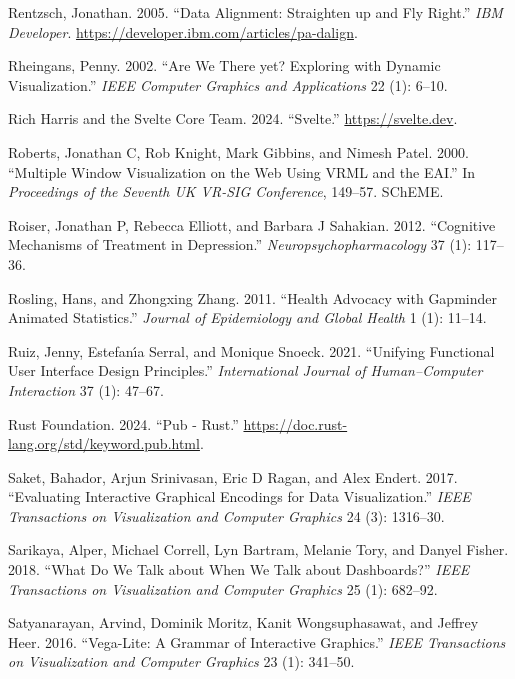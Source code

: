 \documentclass[
]{book}
\newlength{\cslhangindent}
\newenvironment{CSLReferences}[2] %
 {\begin{list}{}{%
  \setlength{\itemindent}{0pt}
  \setlength{\leftmargin}{0pt}
  \setlength{\parsep}{0pt}
  \ifodd #1
   \setlength{\leftmargin}{\cslhangindent}
   \setlength{\itemindent}{-1\cslhangindent}
  \fi
  \setlength{\itemsep}{#2\baselineskip}}}
 {\end{list}}
\theoremstyle{definition}
\theoremstyle{definition}
\theoremstyle{definition}
\theoremstyle{definition}
\theoremstyle{remark}
\begin{document}
\begin{CSLReferences}{1}{0}
Rentzsch, Jonathan. 2005. {``Data Alignment: Straighten up and Fly Right.''} \emph{IBM Developer}. \url{https://developer.ibm.com/articles/pa-dalign}.

Rheingans, Penny. 2002. {``Are We There yet? Exploring with Dynamic Visualization.''} \emph{IEEE Computer Graphics and Applications} 22 (1): 6--10.

Rich Harris and the Svelte Core Team. 2024. {``Svelte.''} \url{https://svelte.dev}.

Roberts, Jonathan C, Rob Knight, Mark Gibbins, and Nimesh Patel. 2000. {``Multiple Window Visualization on the Web Using VRML and the EAI.''} In \emph{Proceedings of the Seventh UK VR-SIG Conference}, 149--57. SChEME.

Roiser, Jonathan P, Rebecca Elliott, and Barbara J Sahakian. 2012. {``Cognitive Mechanisms of Treatment in Depression.''} \emph{Neuropsychopharmacology} 37 (1): 117--36.

Rosling, Hans, and Zhongxing Zhang. 2011. {``Health Advocacy with Gapminder Animated Statistics.''} \emph{Journal of Epidemiology and Global Health} 1 (1): 11--14.

Ruiz, Jenny, Estefanı́a Serral, and Monique Snoeck. 2021. {``Unifying Functional User Interface Design Principles.''} \emph{International Journal of Human--Computer Interaction} 37 (1): 47--67.

Rust Foundation. 2024. {``Pub - Rust.''} \url{https://doc.rust-lang.org/std/keyword.pub.html}.

Saket, Bahador, Arjun Srinivasan, Eric D Ragan, and Alex Endert. 2017. {``Evaluating Interactive Graphical Encodings for Data Visualization.''} \emph{IEEE Transactions on Visualization and Computer Graphics} 24 (3): 1316--30.

Sarikaya, Alper, Michael Correll, Lyn Bartram, Melanie Tory, and Danyel Fisher. 2018. {``What Do We Talk about When We Talk about Dashboards?''} \emph{IEEE Transactions on Visualization and Computer Graphics} 25 (1): 682--92.

Satyanarayan, Arvind, Dominik Moritz, Kanit Wongsuphasawat, and Jeffrey Heer. 2016. {``Vega-Lite: A Grammar of Interactive Graphics.''} \emph{IEEE Transactions on Visualization and Computer Graphics} 23 (1): 341--50.


\end{CSLReferences}
\end{document}
